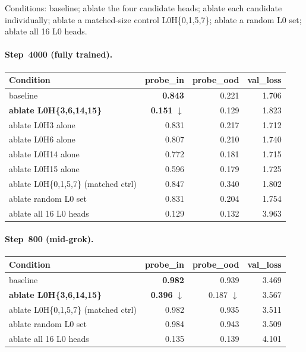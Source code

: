 \documentclass[11pt]{article}
\begin{document}
Conditions: baseline; ablate the four candidate heads; ablate each candidate individually; ablate a matched-size control L0H\{0,1,5,7\}; ablate a random L0 set; ablate all 16 L0 heads.

\paragraph{Step~4000 (fully trained).}
\begin{center}
\small
\begin{tabular}{lrrr}
\toprule
Condition & probe\_in & probe\_ood & val\_loss \\
\midrule
baseline                              & \textbf{0.843} & 0.221 & 1.706 \\
\textbf{ablate L0H\{3,6,14,15\}}      & \textbf{0.151} $\downarrow$ & 0.129 & 1.823 \\
ablate L0H3 alone                     & 0.831 & 0.217 & 1.712 \\
ablate L0H6 alone                     & 0.807 & 0.210 & 1.740 \\
ablate L0H14 alone                    & 0.772 & 0.181 & 1.715 \\
ablate L0H15 alone                    & 0.596 & 0.179 & 1.725 \\
ablate L0H\{0,1,5,7\} (matched ctrl)  & 0.847 & 0.340 & 1.802 \\
ablate random L0 set                  & 0.831 & 0.204 & 1.754 \\
ablate all 16 L0 heads                & 0.129 & 0.132 & 3.963 \\
\bottomrule
\end{tabular}
\end{center}

\paragraph{Step~800 (mid-grok).}
\begin{center}
\small
\begin{tabular}{lrrr}
\toprule
Condition & probe\_in & probe\_ood & val\_loss \\
\midrule
baseline                              & \textbf{0.982} & 0.939 & 3.469 \\
\textbf{ablate L0H\{3,6,14,15\}}      & \textbf{0.396} $\downarrow$ & 0.187 $\downarrow$ & 3.567 \\
ablate L0H\{0,1,5,7\} (matched ctrl)  & 0.982 & 0.935 & 3.511 \\
ablate random L0 set                  & 0.984 & 0.943 & 3.509 \\
ablate all 16 L0 heads                & 0.135 & 0.139 & 4.101 \\
\bottomrule
\end{tabular}
\end{center}
\end{document}
